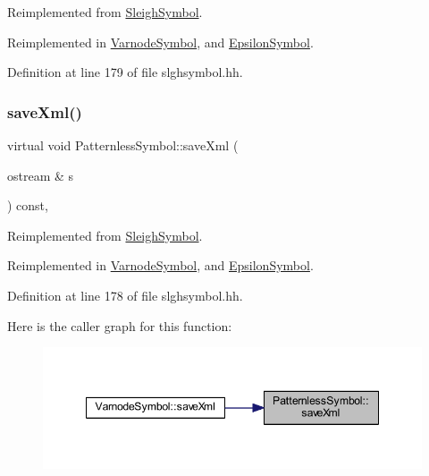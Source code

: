 Reimplemented from \mbox{\hyperlink{class_sleigh_symbol_accaec1696f99366fb0e089a7fceb56a3}{Sleigh\+Symbol}}.



Reimplemented in \mbox{\hyperlink{class_varnode_symbol_a9d0f7e98d0425e26ca4eddf002f1e471}{Varnode\+Symbol}}, and \mbox{\hyperlink{class_epsilon_symbol_a0ce24cb1b91e38a1c45b5ec9d6af553a}{Epsilon\+Symbol}}.



Definition at line 179 of file slghsymbol.\+hh.

\mbox{\label{class_patternless_symbol_a4afb029a1e6456ffa90468cb29587529}} 
\subsubsection{\texorpdfstring{saveXml()}{saveXml()}}
{\footnotesize\ttfamily virtual void Patternless\+Symbol\+::save\+Xml (\begin{DoxyParamCaption}\item[{ostream \&}]{s }\end{DoxyParamCaption}) const\hspace{0.3cm}{\ttfamily [inline]}, {\ttfamily [virtual]}}



Reimplemented from \mbox{\hyperlink{class_sleigh_symbol_a83c9a32d16419d2277c5b9d542e1cf13}{Sleigh\+Symbol}}.



Reimplemented in \mbox{\hyperlink{class_varnode_symbol_aed153df5b4c3fdb8c04bf422e2ea329b}{Varnode\+Symbol}}, and \mbox{\hyperlink{class_epsilon_symbol_a825d93a75ea8a0d3c3448ce5abef3f27}{Epsilon\+Symbol}}.



Definition at line 178 of file slghsymbol.\+hh.

Here is the caller graph for this function\+:
\nopagebreak
\begin{figure}[H]
\begin{center}
\leavevmode
\includegraphics[width=348pt]{class_patternless_symbol_a4afb029a1e6456ffa90468cb29587529_icgraph}
\end{center}
\end{figure}


